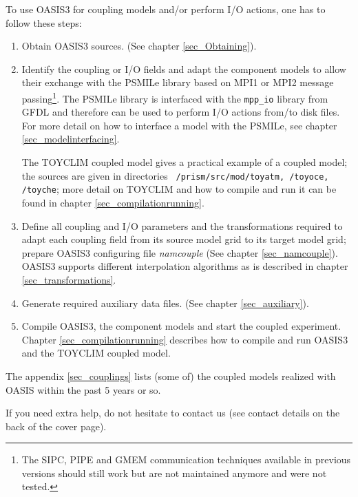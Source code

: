 To use OASIS3 for coupling models and/or perform I/O
actions, one has to follow these steps:
\begin{enumerate}
\item Obtain OASIS3 sources. (See chapter \ref{sec_Obtaining}).
\item Identify the coupling or I/O fields and adapt the component
  models to allow their exchange with the PSMILe library based on MPI1
  or MPI2 message passing\footnote{The SIPC, PIPE and GMEM
    communication techniques available in previous versions should
    still work but are not maintained anymore and were not tested.}.
  The PSMILe library is interfaced with the {\tt mpp\_io} library from
  GFDL \cite{mpp_io} and therefore can be used to perform I/O actions
  from/to disk files.  For more detail on how to interface a model
  with the PSMILe, see chapter \ref{sec_modelinterfacing}.

The TOYCLIM coupled model gives a practical example of a coupled
model; the sources are given in directories {\tt
  /prism/src/mod/toyatm, /toyoce, /toyche}; more detail on TOYCLIM and
how to compile and run it can be found in chapter
\ref{sec_compilationrunning}.

\item Define all coupling and I/O parameters and the transformations
  required to adapt each coupling field from its source model grid to
  its target model grid; prepare OASIS3 configuring file {\it
  namcouple} (See chapter \ref{sec_namcouple}). 
  OASIS3 supports different interpolation algorithms as is described in
  chapter \ref{sec_transformations}.

\item Generate required auxiliary data files. (See chapter
  \ref{sec_auxiliary}).
\item Compile OASIS3, the component models and start the coupled
  experiment. Chapter \ref{sec_compilationrunning} describes how to
  compile and run OASIS3 and the TOYCLIM coupled model.

\end{enumerate}

The appendix \ref{sec_couplings} lists (some of) the coupled
models realized with OASIS within the past 5 years or so.  

If you need extra help, do not hesitate to contact us (see contact
details on the back of the cover page).

